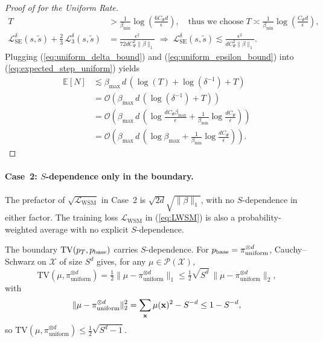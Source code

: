 \documentclass{article} %
\def\eqref#1{equation~\ref{#1}}
\newcommand{\bfx}{{\bf x}}
\newcommand{\TV}{\mathrm{TV}}
\newcommand{\LWSM}{\mathcal{L}_{\mathrm{WSM}}}
\newcommand{\LSE}{\mathcal{L}_{\mathrm{SE}}}
\renewcommand{\eqref}[1]{\textup{(\ref{#1})}}
\newcommand{\LThree}{\mathcal{L}_{3}}
\newcommand{\betamax}{\beta_{\mathrm{max}}}
\newcommand{\betamin}{\beta_{\mathrm{min}}}
\begin{document}
\begin{proof}[Proof of  for the Uniform Rate]
\begin{align}
        T  &> \frac{1}{\betamin} \log\left( \frac{6C_\Psi d}{\epsilon} \right), \quad \text{thus we choose} \; T \asymp \frac{1}{\betamin} \log\left( \frac{C_\Psi d}{\epsilon} \right), \label{eq:uniform_epsilon_bound}\\
        \LSE^\delta(s, \tilde{s}) + \tfrac{2}{3}\,\LThree^\delta(s, \tilde{s}) &= \frac{\epsilon^2}{72 d C_\Psi^2 \| \beta \|_1} \;\Rightarrow \; \LSE^\delta(s, \tilde{s}) \lesssim \frac{\epsilon^2}{ d C_\Psi^2 \| \beta \|_1}.
    \end{align}
    Plugging \eqref{eq:uniform_delta_bound} and \eqref{eq:uniform_epsilon_bound} into \eqref{eq:expected_step_uniform} yields
    \begin{align*}
        \mathbb{E}[N] &\lesssim \betamax \, d \,  \left( \log \left( T\right) + \log \left( \delta^{-1} \right) + T \right) \\
        &= \mathcal{O} \left( \betamax \, d \,  \left(  \log \left( \delta^{-1} \right) + T \right) \right) \\
        &= \mathcal{O} \left( \betamax \, d \, \left( \log \frac{d C_\Psi \betamax}{\epsilon} + \frac{1}{\betamin} \log \frac{d C_\Psi}{\epsilon} \right) \right) \\
        &= \mathcal{O} \left( \betamax \, d \, \left( \log\betamax +  \frac{1}{\betamin} \log \frac{d C_\Psi}{\epsilon} \right) \right). 
    \end{align*}
\end{proof}
\iffalse
\paragraph{Case~2: $S$-dependence only in the boundary.} The prefactor of
$\sqrt{\LWSM}$ in Case~2 is $\sqrt{2d}\sqrt{\|\beta\|_1}$, with no
$S$-dependence in either factor. The training loss $\LWSM$ in
\eqref{eq:LWSM} is also a probability-weighted average with no explicit
$S$-dependence.

The boundary $\TV(p_T, p_{\rm base})$ carries $S$-dependence. For
$p_{\rm base} = \pi_{\mathrm{uniform}}^{\otimes d}$, Cauchy--Schwarz on $\mathcal{X}$
of size $S^d$ gives, for any $\mu \in \mathcal{P}(\mathcal{X})$,
\begin{equation}
\TV(\mu, \pi_{\mathrm{uniform}}^{\otimes d}) = \tfrac{1}{2}\|\mu - \pi_{\mathrm{uniform}}^{\otimes d}\|_1 \le \tfrac{1}{2}\sqrt{S^d}\,\|\mu - \pi_{\mathrm{uniform}}^{\otimes d}\|_2,
\end{equation}
with
\begin{equation}
\|\mu - \pi_{\mathrm{uniform}}^{\otimes d}\|_2^2 = \sum_\bfx \mu(\bfx)^2 - S^{-d} \le 1 - S^{-d},
\end{equation}
so $\TV(\mu, \pi_{\mathrm{uniform}}^{\otimes d}) \le \tfrac{1}{2}\sqrt{S^d - 1}$.
\end{document}
